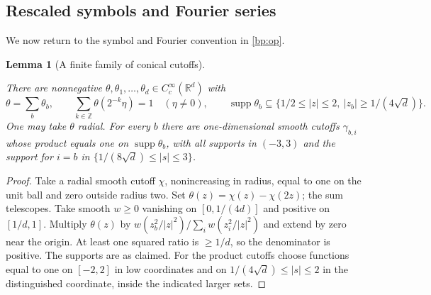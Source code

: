 \documentclass[11pt,letterpaper]{article}
\newtheorem{lemma}[theorem]{Lemma}
\theoremstyle{definition}
\newcommand{\R}{\mathbb R}
\providecommand{\lean}[1]{}
\begin{document}
\subsection{Rescaled symbols and Fourier series}
We now return to the symbol and Fourier convention in \eqref{bp:op}.

\begin{lemma}[A finite family of conical cutoffs]\label{bp:cone-cutoffs}
\lean{TwistedParaproduct.coneCutoffs}
There are nonnegative \(\theta,\theta_1,\ldots,\theta_d
\in C_c^\infty(\R^d)\) with
\[
 \theta=\sum_b\theta_b,\qquad
 \sum_{k\in\mathbb Z}\theta(2^{-k}\eta)=1\quad(\eta\ne0),\qquad
 \operatorname{supp}\theta_b\subseteq
 \{1/2\le |z|\le2,\ |z_b|\ge 1/(4\sqrt d)\}.
\]
One may take \(\theta\) radial. For every \(b\) there are
one-dimensional smooth cutoffs \(\gamma_{b,i}\) whose product equals
one on \(\operatorname{supp}\theta_b\), with all supports in \((-3,3)\)
and the support for \(i=b\) in \(\{1/(8\sqrt d)\le |s|\le3\}\).
\end{lemma}
\begin{proof}
Take a radial smooth cutoff \(\chi\), nonincreasing in radius,
equal to one on the unit ball and zero outside radius two. Set
\(\theta(z)=\chi(z)-\chi(2z)\); the sum telescopes. Take smooth
\(w\ge0\) vanishing on \([0,1/(4d)]\) and positive on \([1/d,1]\).
Multiply \(\theta(z)\) by \(w(z_b^2/|z|^2)/\sum_iw(z_i^2/|z|^2)\)
and extend by zero near the origin. At least one squared ratio is
\(\ge1/d\), so the denominator is positive. The supports are as
claimed. For the product cutoffs choose functions equal to one on
\([-2,2]\) in low coordinates and on \(1/(4\sqrt d)\le |s|\le2\)
in the distinguished coordinate, inside the indicated larger sets.
\end{proof}
\end{document}
